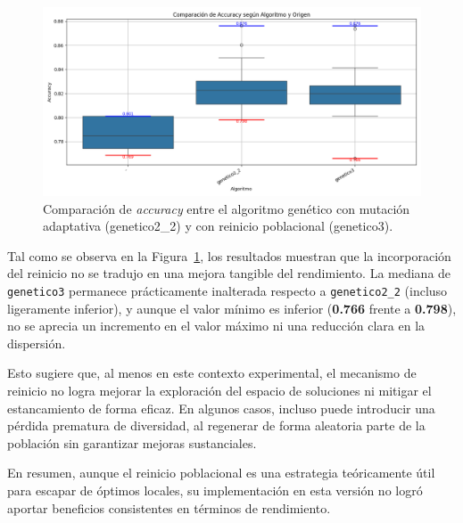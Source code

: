 \begin{figure}[htp]
    \centering
    \includegraphics[width=1\textwidth]{imagenes/evaluaciones/reinicio-poblacional}
    \caption{Comparación de \textit{accuracy} entre el algoritmo genético con mutación adaptativa (genetico2\_2) y con reinicio poblacional (genetico3).}
    \label{fig:reinicio_poblacional}
\end{figure}

Tal como se observa en la Figura~\ref{fig:reinicio_poblacional}, los resultados muestran que la incorporación del reinicio no se tradujo en una mejora tangible del rendimiento.
La mediana de \texttt{genetico3} permanece prácticamente inalterada respecto a \texttt{genetico2\_2} (incluso ligeramente inferior),
y aunque el valor mínimo es inferior (\textbf{0.766} frente a \textbf{0.798}), no se aprecia un incremento en el valor máximo ni una reducción clara en la dispersión.

Esto sugiere que, al menos en este contexto experimental, el mecanismo de reinicio no logra mejorar la exploración del espacio de soluciones
ni mitigar el estancamiento de forma eficaz.
En algunos casos, incluso puede introducir una pérdida prematura de diversidad, al regenerar de forma aleatoria parte de la población sin garantizar mejoras sustanciales.

En resumen, aunque el reinicio poblacional es una estrategia teóricamente útil para escapar de óptimos locales,
su implementación en esta versión no logró aportar beneficios consistentes en términos de rendimiento.

